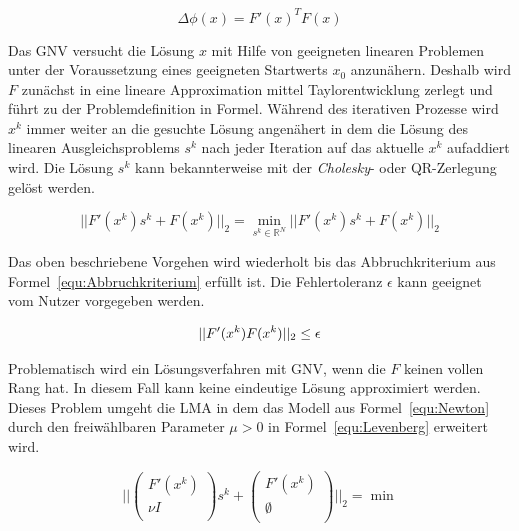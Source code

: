 \begin{equation}
\label{equ:GradPhi}
\Delta\phi(x)=F'(x)^TF(x)
\end{equation}

Das GNV versucht die Lösung $x$ mit Hilfe von geeigneten linearen Problemen unter der Voraussetzung eines geeigneten Startwerts $x_0$ anzunähern. Deshalb wird $F$ zunächst in eine lineare Approximation mittel Taylorentwicklung zerlegt und führt zu der Problemdefinition in Formel. Während des iterativen Prozesse wird $x^k$ immer weiter an die gesuchte Lösung angenähert in dem die Lösung des linearen Ausgleichsproblems $s^k$ nach jeder Iteration auf das aktuelle $x^k$ aufaddiert wird. Die Lösung $s^k$ kann bekannterweise mit der \textit{Cholesky}- oder QR-Zerlegung gelöst werden.

\begin{equation}
\label{equ:Newton}
||F'(x^k)s^k+F(x^k)||_2 = \min_{s^k \in \mathbb{R}^N}||F'(x^k)s^k+F(x^k)||_2
\end{equation}

Das oben beschriebene Vorgehen wird wiederholt bis das Abbruchkriterium aus Formel~\ref{equ:Abbruchkriterium} erfüllt ist. Die Fehlertoleranz $\epsilon$ kann geeignet vom Nutzer vorgegeben werden.

\begin{equation}
\label{equ:Abbruchkriterium}
||F'(x^k)F(x^k)||_2 \leq \epsilon\\
\end{equation}

Problematisch wird ein Lösungsverfahren mit GNV, wenn die $F$ keinen vollen Rang hat. In diesem Fall kann keine eindeutige Lösung approximiert werden. Dieses Problem umgeht die LMA in dem das Modell aus Formel~\ref{equ:Newton} durch den freiwählbaren Parameter $\mu>0$ in Formel~\ref{equ:Levenberg} erweitert wird. 

\begin{equation}
\label{equ:Levenberg}
||
\begin{pmatrix}
F'(x^k)\\\nu I\\
\end{pmatrix}
s^k+\begin{pmatrix}
F'(x^k)\\\emptyset\\
\end{pmatrix}||_2 = \min
\end{equation}

